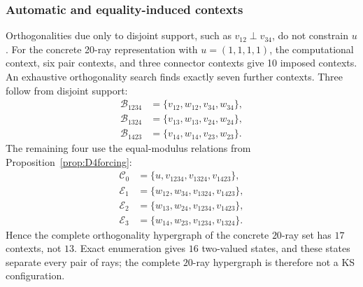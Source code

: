 \documentclass[%
  reprint,
  superscriptaddress,
  showpacs,
  showkeys,
  amsmath,amssymb,
  pra,
  longbibliography,
  floatfix,
  x11names
]{revtex4-2}
\newenvironment{revision}{\begingroup}{\endgroup}
\begin{document}
\begin{revision}
\subsubsection{Automatic and equality-induced contexts}
Orthogonalities due only to disjoint support, such as $v_{12}\perp v_{34}$, do not constrain $u$.  For the concrete 20-ray representation with $u=(1,1,1,1)$, the computational context, six pair contexts, and three connector contexts give 10 imposed contexts.  An exhaustive orthogonality search finds exactly seven further contexts.  Three follow from disjoint support:
\begin{align*}
\mathcal{B}_{1234}&=\{v_{12},w_{12},v_{34},w_{34}\},\\
\mathcal{B}_{1324}&=\{v_{13},w_{13},v_{24},w_{24}\},\\
\mathcal{B}_{1423}&=\{v_{14},w_{14},v_{23},w_{23}\}.
\end{align*}
The remaining four use the equal-modulus relations from Proposition~\ref{prop:D4forcing}:
\begin{align*}
\mathcal{C}_0&=\{u,v_{1234},v_{1324},v_{1423}\},\\
\mathcal{E}_1&=\{w_{12},w_{34},v_{1324},v_{1423}\},\\
\mathcal{E}_2&=\{w_{13},w_{24},v_{1234},v_{1423}\},\\
\mathcal{E}_3&=\{w_{14},w_{23},v_{1234},v_{1324}\}.
\end{align*}
Hence the complete orthogonality hypergraph of the concrete $20$-ray set has $17$ contexts, not $13$.  Exact enumeration gives $16$ two-valued states, and these states separate every pair of rays; the complete $20$-ray hypergraph is therefore not a KS configuration.
\end{revision}
\end{document}
